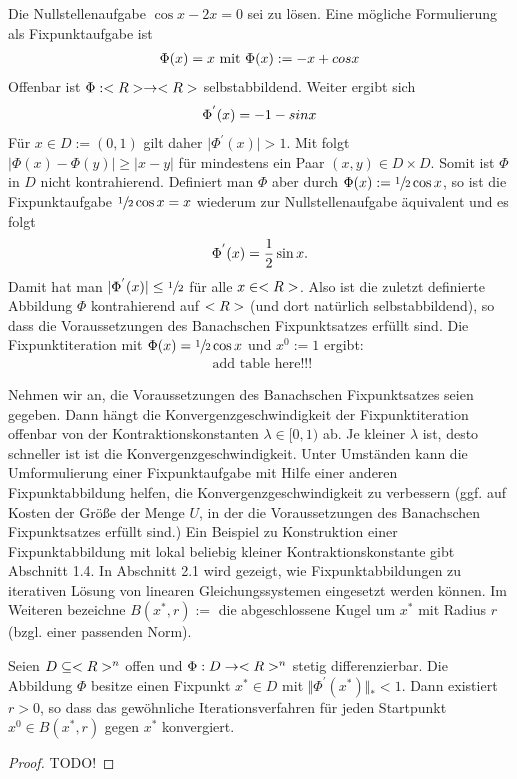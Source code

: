 \begin{example}
	Die Nullstellenaufgabe $\cos x - 2x = 0$ sei zu lösen. Eine mögliche Formulierung als Fixpunktaufgabe ist
	\begin{align}
	\Phi(x) = x \text{   mit  } \Phi(x) := -x + cos x \notag
	\end{align}
	Offenbar ist $\Phi: <R> \to <R>$ selbstabbildend. Weiter ergibt sich
	\begin{align}
	\Phi^{'}(x) = -1 - sin x \notag
	\end{align}
	Für $x \in D := (0,1)$ gilt daher $\vert \Phi^{'} (x)\vert > 1$. Mit  folgt $\vert \Phi(x) - \Phi(y)\vert \ge \vert x-y\vert$ für mindestens ein Paar $(x,y) \in D \times D$. Somit ist $\Phi$ in $D$ nicht kontrahierend.
	Definiert man $\Phi$ aber durch $\Phi(x) := \sfrac{1}{2}\cos x$, so ist die Fixpunktaufgabe $\sfrac{1}{2}\cos x = x$ wiederum zur Nullstellenaufgabe äquivalent und es folgt
	\begin{align}
	\Phi^{'}(x) = \frac{1}{2}\sin x. \notag
	\end{align} 
	Damit hat man $\vert \Phi^{'}(x)\vert \le \sfrac{1}{2}$ für alle $x \in <R>$. Also ist die zuletzt definierte Abbildung $\Phi$ kontrahierend auf $<R>$ (und dort natürlich selbstabbildend), so dass die Voraussetzungen des Banachschen Fixpunktsatzes erfüllt sind. Die Fixpunktiteration mit $\Phi(x) = \sfrac{1}{2}\cos x$ und $x^0 := 1$ ergibt:
	\begin{align}
	\text{ add table here!!!}
	\end{align}
\end{example}

Nehmen wir an, die Voraussetzungen des Banachschen Fixpunktsatzes seien gegeben. Dann hängt die Konvergenzgeschwindigkeit der Fixpunktiteration offenbar von der Kontraktionskonstanten $\lambda \in [0,1)$ ab. Je kleiner $\lambda$ ist, desto schneller ist ist die Konvergenzgeschwindigkeit. Unter Umständen kann die Umformulierung einer Fixpunktaufgabe mit Hilfe einer anderen Fixpunktabbildung helfen, die Konvergenzgeschwindigkeit zu verbessern (ggf. auf Kosten der Größe der Menge $U$, in der die Voraussetzungen des Banachschen Fixpunktsatzes erfüllt sind.) Ein Beispiel zu Konstruktion einer Fixpunktabbildung mit lokal beliebig kleiner Kontraktionskonstante gibt Abschnitt 1.4. In Abschnitt 2.1 wird gezeigt, wie Fixpunktabbildungen zu iterativen Lösung von linearen Gleichungssystemen eingesetzt werden können.
Im Weiteren bezeichne $B(x^{\ast}, r) :=$ die abgeschlossene Kugel um $x^{\ast}$ mit Radius $r$ (bzgl. einer passenden Norm).

\begin{proposition}[Ostrowski]
	Seien $D \subseteq <R>^n$ offen und $\Phi: D \to <R>^n$ stetig differenzierbar. Die Abbildung $\Phi$ besitze einen Fixpunkt $x^{\ast} \in D$ mit $\Vert \Phi^{'}(x^{\ast})\Vert_{\ast} < 1$. Dann existiert $r > 0$, so dass das gewöhnliche Iterationsverfahren für jeden Startpunkt $x^0 \in B(x^{\ast}, r)$ gegen $x^{\ast}$ konvergiert.
\end{proposition}

\begin{proof}
	TODO!
\end{proof}